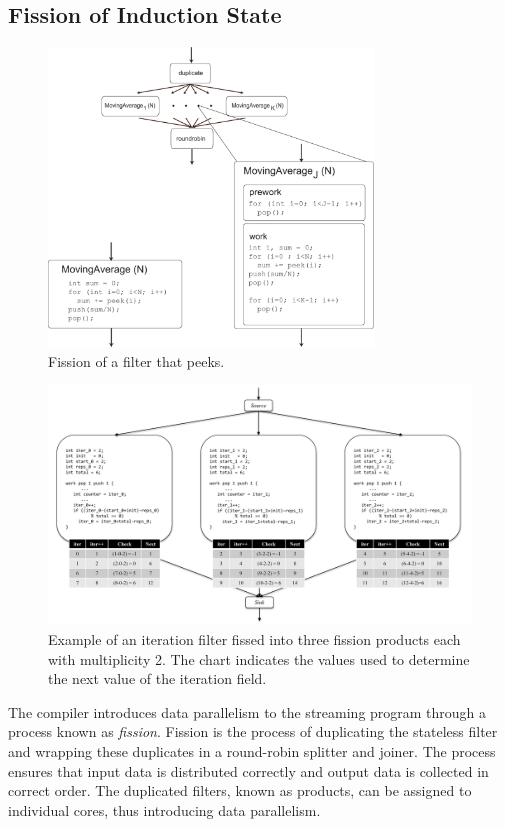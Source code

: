 \subsection{Fission of Induction State}
\label{sec:fission}

\begin{figure}[t!]
\centering
\includegraphics[width=3.4in]{figures/duplicate-fission.pdf}
\caption{Fission of a filter that peeks. \protect\label{fig:duplicate-fission-example}}
\end{figure}


\begin{figure}[t!]
\centering
\includegraphics[width=6.5in]{figures/fission-example.pdf}
\caption{Example of an iteration filter fissed into three fission products each with multiplicity 2.  The chart indicates the values used to determine the next value of the iteration field.  
\protect\label{fig:fission-example}}
\end{figure}

The compiler introduces data parallelism to the streaming program through a process known as {\it fission}.  Fission is the process of duplicating the stateless filter and wrapping these duplicates in a round-robin splitter and joiner.  The process ensures that input data is distributed correctly and output data is collected in correct order.  The duplicated filters, known as products, can be assigned to individual cores, thus introducing data parallelism.  

